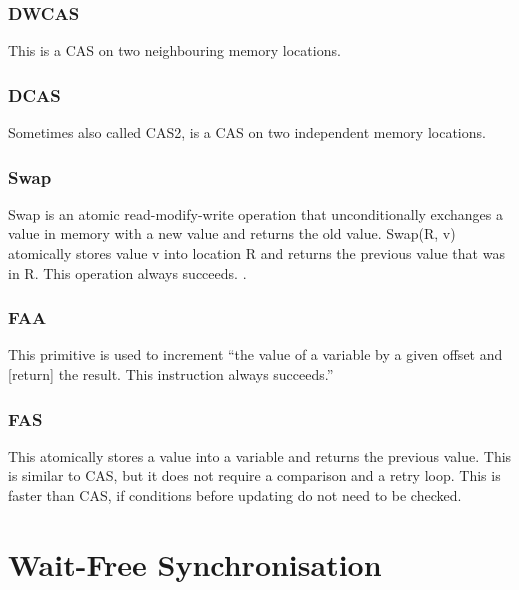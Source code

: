 \subsubsection{\ac{DWCAS}}\label{subsubsec:double-compare-and-swap}
This is a \ac{CAS} on two neighbouring memory locations. \cite{Fuchs2014EvaluationOT}

\subsubsection{\ac{DCAS}}\label{subsubsec:double-with-compare-and-swap}
Sometimes also called \ac{CAS}2, is a \ac{CAS} on two independent memory locations. \cite{Fuchs2014EvaluationOT}

\subsubsection{Swap}\label{subsubsec:swap}
Swap is an atomic read-modify-write operation that unconditionally exchanges a value in memory with a new value and returns the old value. Swap(R, v) atomically stores value v into location R and returns the previous value that was in R. This operation always succeeds. \cite{Mateíspmc}.

\subsubsection{\acf{FAA}}\label{subsubsec:fetch-and-add}
This primitive is used to increment \enquote{the value of a variable by a given offset and [return] the result. This instruction always succeeds.} \cite{Fuchs2014EvaluationOT}

\subsubsection{\ac{FAS}}\label{subsubsec:fetch-and-store}
This atomically stores a value into a variable and returns the previous value. This is similar to \ac{CAS}, but it does not require a comparison and a retry loop. This is faster than \ac{CAS}, if conditions before updating do not need to be checked. \cite{Drescher2015GuardedSections}

\section{Wait-Free Synchronisation}\label{sec:wait-free}

